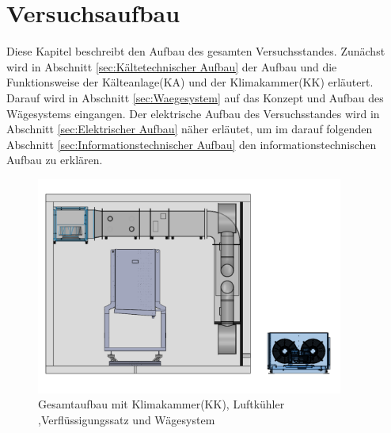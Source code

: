 \chapter{Versuchsaufbau}
\label{cha: Versuchsaufbau}

Diese Kapitel beschreibt den Aufbau des gesamten Versuchsstandes. Zunächst wird in Abschnitt \ref{sec:Kältetechnischer Aufbau} der Aufbau und die Funktionsweise der Kälteanlage(KA) und der Klimakammer(KK) erläutert. Darauf wird in Abschnitt \ref{sec:Waegesystem} auf das Konzept und Aufbau des Wägesystems eingangen. 
Der elektrische Aufbau des Versuchsstandes wird in Abschnitt \ref{sec:Elektrischer Aufbau} näher erläutet, um im darauf folgenden Abschnitt \ref{sec:Informationstechnischer Aufbau} den informationstechnischen Aufbau zu erklären. 


\begin{figure}[htb]
\centering		\includegraphics[width=0.90\textwidth]{Pictures/Gesamtaufbau_Klimakammer_front.pdf}
\caption{Gesamtaufbau mit Klimakammer(KK), Luftkühler ,Verflüssigungssatz und Wägesystem}
\label{fig:}
\end{figure}










